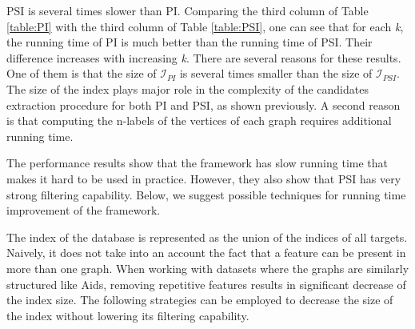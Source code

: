 \documentclass{l4proj}
\newcommand{\fancyI}{\mathcal{I}}
\begin{document}
PSI is several times slower than PI. Comparing the third column of Table \ref{table:PI} with the third column of Table \ref{table:PSI}, one can see that for each \emph{k}, the running time of PI is much better than the running time of PSI. Their difference increases with increasing \emph{k}. There are several reasons for these results. One of them is that the size of $\fancyI_{PI}$ is several times smaller than the size of $\fancyI_{PSI}$. The size of the index plays major role in the complexity of the candidates extraction procedure for both PI and PSI, as shown previously. A second reason is that computing the n-labels of the vertices of each graph requires additional running time.



The performance results show that the framework has slow running time that makes it hard to be used in practice. However, they also show that PSI has very strong filtering capability. Below, we suggest possible techniques for running time improvement of the framework.

The index of the database is represented as the union of the indices of all targets. Naively, it does not take into an account the fact that a feature can be present in more than one graph. When working with datasets where the graphs are similarly structured like Aids, removing repetitive features results in significant decrease of the index size. The following strategies can be employed to decrease the size of the index without lowering its filtering capability.
\end{document}
